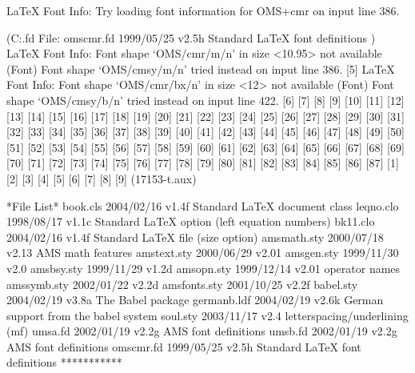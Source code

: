 LaTeX Font Info:    Try loading font information for OMS+cmr on input line 386.

(C:\texmf\tex\latex\base\omscmr.fd
File: omscmr.fd 1999/05/25 v2.5h Standard LaTeX font definitions
)
LaTeX Font Info:    Font shape `OMS/cmr/m/n' in size <10.95> not available
(Font)              Font shape `OMS/cmsy/m/n' tried instead on input line 386.
 [5]
LaTeX Font Info:    Font shape `OMS/cmr/bx/n' in size <12> not available
(Font)              Font shape `OMS/cmsy/b/n' tried instead on input line 422.
 [6] [7] [8] [9] [10] [11] [12] [13]
[14] [15] [16] [17] [18] [19] [20] [21] [22] [23] [24] [25] [26] [27] [28]
[29] [30] [31] [32] [33] [34] [35] [36] [37] [38] [39] [40] [41] [42] [43]
[44] [45] [46] [47] [48] [49] [50] [51] [52] [53] [54] [55] [56] [57] [58]
[59] [60] [61] [62] [63] [64] [65] [66] [67] [68] [69] [70] [71] [72] [73]
[74] [75] [76] [77] [78] [79] [80] [81] [82] [83] [84] [85] [86] [87] [1]
[2] [3] [4] [5] [6] [7] [8] [9] (17153-t.aux)

 *File List*
    book.cls    2004/02/16 v1.4f Standard LaTeX document class
   leqno.clo    1998/08/17 v1.1c Standard LaTeX option (left equation numbers)
    bk11.clo    2004/02/16 v1.4f Standard LaTeX file (size option)
 amsmath.sty    2000/07/18 v2.13 AMS math features
 amstext.sty    2000/06/29 v2.01
  amsgen.sty    1999/11/30 v2.0
  amsbsy.sty    1999/11/29 v1.2d
  amsopn.sty    1999/12/14 v2.01 operator names
 amssymb.sty    2002/01/22 v2.2d
amsfonts.sty    2001/10/25 v2.2f
   babel.sty    2004/02/19 v3.8a The Babel package
 germanb.ldf    2004/02/19 v2.6k German support from the babel system
    soul.sty    2003/11/17 v2.4 letterspacing/underlining (mf)
    umsa.fd    2002/01/19 v2.2g AMS font definitions
    umsb.fd    2002/01/19 v2.2g AMS font definitions
  omscmr.fd    1999/05/25 v2.5h Standard LaTeX font definitions
 ***********

